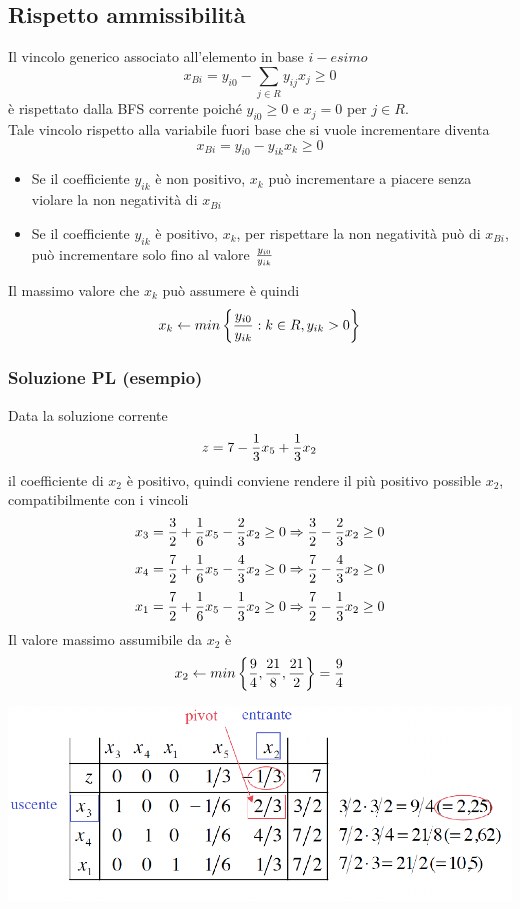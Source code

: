 \documentclass[12pt,a4paper]{article}
\begin{document}
 \subsection{Rispetto ammissibilità}
Il vincolo generico associato all'elemento in base $i-esimo$
$$x_{Bi} = y_{i0} - \sum_{j\in R}y_{ij}x_j \geq 0$$
è rispettato dalla BFS corrente poiché $y_{i0}\geq 0$ e $x_j=0$ per $j\in R$.\\
Tale vincolo rispetto alla variabile fuori base che si vuole incrementare diventa
$$x_{Bi} = y_{i0} - y_{ik}x_k \geq 0$$
\begin{itemize}
\item Se il coefficiente $y_{ik}$ è non positivo, $x_k$ può incrementare a piacere senza violare la non negatività di $x_{Bi}$
\item Se il coefficiente $y_{ik}$ è positivo, $x_k$, per rispettare la non negatività può di $x_{Bi}$, può incrementare solo fino al valore $y_{i0} \over y_{ik}$
\end{itemize}
Il massimo valore che $x_k$ può assumere è quindi
$$x_k \leftarrow min\left\{{y_{i0} \over y_{ik}}:k\in R, y_{ik}>0\right\}$$

\subsubsection{Soluzione PL (esempio)}
Data la soluzione corrente $$z=7-{1\over3}x_5 +{1\over3}x_2$$
il coefficiente di $x_2$ è positivo, quindi conviene rendere il più positivo possible $x_2$, compatibilmente con i vincoli
$$x_3 = {3\over2}+{1\over6}x_5 - {2\over 3}x_2 \geq 0 \Rightarrow {3\over2}-{2\over3}x_2 \geq 0$$
$$x_4 = {7\over2}+{1\over6}x_5 - {4\over 3}x_2 \geq 0 \Rightarrow {7\over2}-{4\over3}x_2 \geq 0$$
$$x_1 = {7\over2}+{1\over6}x_5 - {1\over 3}x_2 \geq 0 \Rightarrow {7\over2}-{1\over3}x_2 \geq 0$$
Il valore massimo assumibile da $x_2$ è 
$$x_2 \leftarrow min\left\{{9\over4},{21\over8}, {21\over2}\right\} = {9\over 4}$$
\begin{center}
\includegraphics[width=0.5\columnwidth]{img/soles_amm.png}
\end{center} 
 
\end{document}
